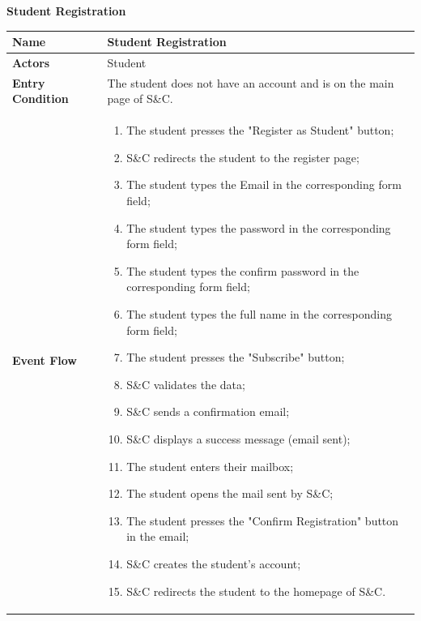         \begin{enumerate}[label=\textbf{[US\arabic*]}, left = 0pt, align = left, resume]
            \item \textbf{Student Registration}
            
            \begin{longtable}{|l|p{11cm}|}  
                \hline
                \textbf{Name} & 
                    \textbf{Student Registration} \\
                \hline
                
                \textbf{Actors} & 
                    Student \\
                \hline
                
                \textbf{Entry Condition} & 
                    The student does not have an account and is on the main page of S\&C. \\
                \hline
                
                \textbf{Event Flow} &
                    \begin{enumerate}[label=\arabic*., itemsep=0.2em]
                        \item The student presses the "Register as Student" button;
                        \item S\&C redirects the student to the register page;
                        \item The student types the Email in the corresponding form field;
                        \item The student types the password in the corresponding form field;
                        \item The student types the confirm password in the corresponding form field;
                        \item The student types the full name in the corresponding form field;
                        \item The student presses the "Subscribe" button;
                        \item S\&C validates the data;
                        \item S\&C sends a confirmation email;
                        \item S\&C displays a success message (email sent);
                        \item The student enters their mailbox;
                        \item The student opens the mail sent by S\&C;
                        \item The student presses the "Confirm Registration" button in the email;
                        \item S\&C creates the student's account;
                        \item S\&C redirects the student to the homepage of S\&C.
                    \end{enumerate} \\
                \hline
                

\end{longtable}
\end{enumerate}
